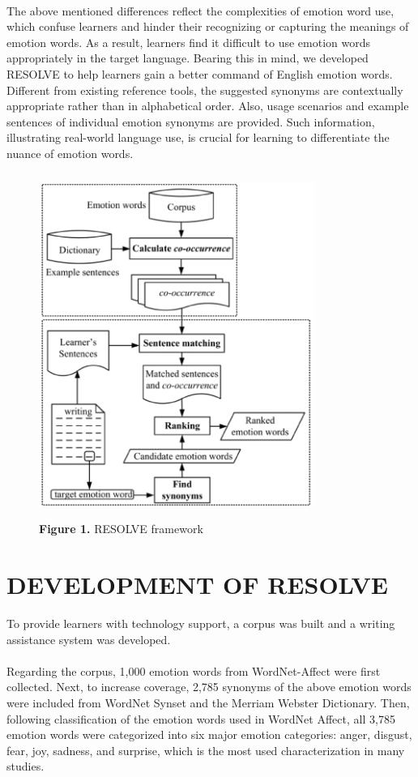 \documentclass[a4paper,12pt,oneside]{article}
\let\counterwithin\relax
\begin{document}
\paragraph{}
The above mentioned differences reflect the complexities of emotion word use, which confuse learners and hinder their recognizing or capturing the meanings of emotion words. As a result, learners find it difficult to use emotion words appropriately in the target language. Bearing this in mind, we developed RESOLVE to help learners gain a better command of English emotion words. Different from existing reference tools, the suggested synonyms are contextually appropriate rather than in alphabetical order. Also, usage scenarios and example sentences of individual emotion synonyms are provided. Such information, illustrating real-world language use, is crucial for learning to differentiate the nuance of emotion words. 


\begin{figure}[H]
\includegraphics[height=11.25cm,width=9cm]{Figure1.png}
\centering
\caption{ \textbf{Figure 1.} RESOLVE framework}
\end{figure}

\newpage
\section{DEVELOPMENT OF RESOLVE}
To provide learners with technology support, a corpus was built and a writing assistance system was developed. 
\paragraph{}
Regarding the corpus, 1,000 emotion words from WordNet-Affect were first collected. Next, to increase coverage, 2,785 synonyms of the above emotion words were included from WordNet Synset and the Merriam Webster Dictionary. Then, following classification of the emotion words used in WordNet Affect, all 3,785 emotion words were categorized into six major emotion categories: anger, disgust, fear, joy, sadness, and surprise, which is the most used characterization in many studies. 
\end{document}
